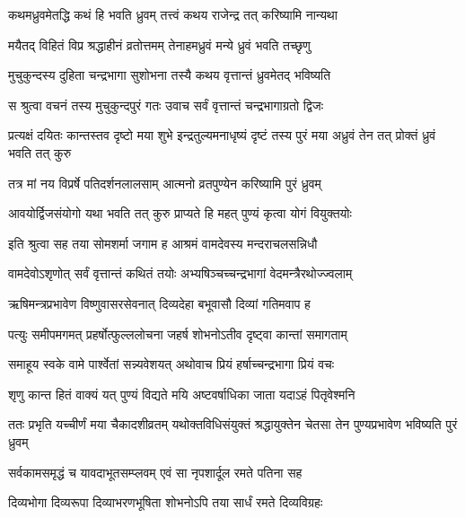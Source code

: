 \twolineshloka
{कथमध्रुवमेतद्धि कथं हि भवति ध्रुवम्}
{तत्त्वं कथय राजेन्द्र तत् करिष्यामि नान्यथा}%


\twolineshloka
{मयैतद् विहितं विप्र श्रद्धाहीनं व्रतोत्तमम्}
{तेनाहमध्रुवं मन्ये ध्रुवं भवति तच्छृणु}%

\twolineshloka
{मुचुकुन्दस्य दुहिता चन्द्रभागा सुशोभना}
{तस्यै कथय वृत्तान्तं ध्रुवमेतद् भविष्यति}%


\twolineshloka
{स श्रुत्वा वचनं तस्य मुचुकुन्दपुरं गतः}
{उवाच सर्वं वृत्तान्तं चन्द्रभागाग्रतो द्विजः}%


\threelineshloka
{प्रत्यक्षं दयितः कान्तस्तव दृष्टो मया शुभे}
{इन्द्रतुल्यमनाधृष्यं दृष्टं तस्य पुरं मया}
{अध्रुवं तेन तत् प्रोक्तं ध्रुवं भवति तत् कुरु}%


\twolineshloka
{तत्र मां नय विप्रर्षे पतिदर्शनलालसाम्}
{आत्मनो व्रतपुण्येन करिष्यामि पुरं ध्रुवम्}%

\twolineshloka
{आवयोर्द्विजसंयोगो यथा भवति तत् कुरु}
{प्राप्यते हि महत् पुण्यं कृत्वा योगं वियुक्तयोः}%

\twolineshloka
{इति श्रुत्वा सह तया सोमशर्मा जगाम ह}
{आश्रमं वामदेवस्य मन्दराचलसन्निधौ}%

\twolineshloka
{वामदेवोऽशृणोत् सर्वं वृत्तान्तं कथितं तयोः}
{अभ्यषिञ्चच्चन्द्रभागां वेदमन्त्रैरथोज्ज्वलाम्}%

\twolineshloka
{ऋषिमन्त्रप्रभावेण विष्णुवासरसेवनात्}
{दिव्यदेहा बभूवासौ दिव्यां गतिमवाप ह}%

\twolineshloka
{पत्युः समीपमगमत् प्रहर्षोत्फुल्ललोचना}
{जहर्ष शोभनोऽतीव दृष्ट्वा कान्तां समागताम्}%

\twolineshloka
{समाहूय स्वके वामे पार्श्वेतां सन्न्यवेशयत्}
{अथोवाच प्रियं हर्षाच्चन्द्रभागा प्रियं वचः}%

\twolineshloka
{शृणु कान्त हितं वाक्यं यत् पुण्यं विद्यते मयि}
{अष्टवर्षाधिका जाता यदाऽहं पितृवेश्मनि}%

\threelineshloka
{ततः प्रभृति यच्चीर्णं मया चैकादशीव्रतम्}
{यथोक्तविधिसंयुक्तं श्रद्धायुक्तेन चेतसा}
{तेन पुण्यप्रभावेण भविष्यति पुरं ध्रुवम्}%

\twolineshloka
{सर्वकामसमृद्धं च यावदाभूतसम्प्लवम्}
{एवं सा नृपशार्दूल रमते पतिना सह}%

\twolineshloka
{दिव्यभोगा दिव्यरूपा दिव्याभरणभूषिता}
{शोभनोऽपि तया सार्धं रमते दिव्यविग्रहः}%

